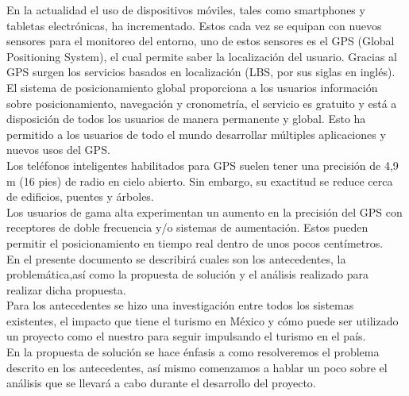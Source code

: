 \vspace*{7cm}
\rightline{{\Huge \textcolor{sectionColor}{Introducción}}}
\vspace*{2cm}


En la actualidad el uso de dispositivos móviles, tales como smartphones y tabletas electrónicas, ha incrementado. Estos cada vez se equipan con nuevos sensores para el monitoreo del entorno, uno de estos sensores es el GPS (Global Positioning System), el cual permite saber la localización del usuario. Gracias al GPS surgen los servicios basados en localización (LBS, por sus siglas en inglés).\\

El sistema de posicionamiento global proporciona a los usuarios información sobre posicionamiento, navegación y cronometría, el servicio es gratuito y está a disposición de todos los usuarios de manera permanente y global. Esto  ha permitido a los usuarios de todo el mundo desarrollar múltiples aplicaciones y nuevos usos del GPS.\\

Los teléfonos inteligentes habilitados para GPS suelen tener una precisión de 4,9 m (16 pies) de radio en cielo abierto. Sin embargo, su exactitud se reduce cerca de edificios, puentes y árboles.\\

Los usuarios de gama alta experimentan un aumento en la precisión del GPS con receptores de doble frecuencia y/o sistemas de aumentación. Estos pueden permitir el posicionamiento en tiempo real dentro de unos pocos centímetros.\cite{gps} \\

En el presente documento se describirá cuales son los antecedentes, la problemática,así como la propuesta de solución y el análisis realizado para realizar dicha propuesta.\\

Para los antecedentes se hizo una investigación entre todos los sistemas existentes, el impacto que tiene el turismo en México y cómo puede ser utilizado un proyecto como el nuestro para seguir impulsando el turismo en el país. \\

En la propuesta de solución se hace énfasis a como resolveremos el problema descrito en los antecedentes, así mismo comenzamos a hablar un poco sobre el análisis que se llevará a cabo durante el desarrollo del proyecto. \\

